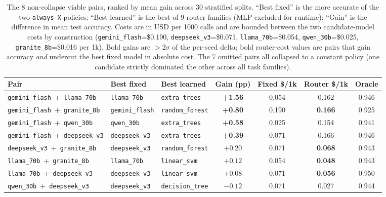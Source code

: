 \documentclass[11pt]{article}
\begin{document}
\begin{table}[t]
\centering
\small
\setlength{\tabcolsep}{4pt}
\begin{tabular}{lllcccc}
\toprule
Pair & Best fixed & Best learned & Gain (pp) & Fixed \$/1k & Router \$/1k & Oracle \\
\midrule
\texttt{gemini\_flash}~+~\texttt{llama\_70b}            & \texttt{llama\_70b}        & \texttt{extra\_trees}       & \textbf{+1.56} & 0.054 & 0.162 & 0.946 \\
\texttt{gemini\_flash}~+~\texttt{granite\_8b}           & \texttt{gemini\_flash}     & \texttt{random\_forest}     & \textbf{+0.80} & 0.190 & \textbf{0.166} & 0.925 \\
\texttt{gemini\_flash}~+~\texttt{qwen\_30b}             & \texttt{qwen\_30b}         & \texttt{extra\_trees}       & \textbf{+0.58} & 0.025 & 0.154 & 0.941 \\
\texttt{gemini\_flash}~+~\texttt{deepseek\_v3}          & \texttt{deepseek\_v3}      & \texttt{extra\_trees}       & \textbf{+0.39} & 0.071 & 0.166 & 0.946 \\
\texttt{deepseek\_v3}~+~\texttt{granite\_8b}            & \texttt{deepseek\_v3}      & \texttt{random\_forest}     & $+0.20$        & 0.071 & \textbf{0.068} & 0.943 \\
\texttt{llama\_70b}~+~\texttt{granite\_8b}              & \texttt{llama\_70b}        & \texttt{linear\_svm}        & $+0.12$        & 0.054 & \textbf{0.048} & 0.943 \\
\texttt{llama\_70b}~+~\texttt{deepseek\_v3}             & \texttt{deepseek\_v3}      & \texttt{linear\_svm}        & $+0.08$        & 0.071 & \textbf{0.056} & 0.950 \\
\texttt{qwen\_30b}~+~\texttt{deepseek\_v3}              & \texttt{deepseek\_v3}      & \texttt{decision\_tree}     & $-0.12$        & 0.071 & 0.027 & 0.944 \\
\bottomrule
\end{tabular}
\caption{The 8 non-collapse viable pairs, ranked by mean gain across 30 stratified splits. ``Best fixed'' is the more accurate of the two \texttt{always\_X} policies; ``Best learned'' is the best of 9 router families (MLP excluded for runtime); ``Gain'' is the difference in mean test accuracy. Costs are in USD per 1000 calls and are bounded between the two candidate-model costs by construction (\texttt{gemini\_flash}=\$0.190, \texttt{deepseek\_v3}=\$0.071, \texttt{llama\_70b}=\$0.054, \texttt{qwen\_30b}=\$0.025, \texttt{granite\_8b}=\$0.016 per 1k). Bold gains are $>2\sigma$ of the per-seed delta; bold router-cost values are pairs that gain accuracy \emph{and} undercut the best fixed model in absolute cost. The 7 omitted pairs all collapsed to a constant policy (one candidate strictly dominated the other across all task families).}
\label{tab:headline}
\end{table}
\end{document}
